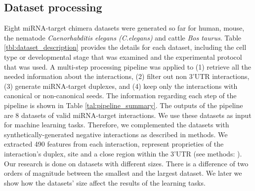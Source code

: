 \documentclass{bmcart}
\begin{document}
\subsection*{Dataset processing}
Eight miRNA-target chimera datasets were generated so far for human, mouse, the nematode \textit{Caenorhabditis elegans (C.elegans)} and cattle \textit{Bos taurus}. Table \ref{tbl:dataset_description} provides the details for each dataset, including the cell type or developmental stage that was examined and the experimental protocol that was used. A multi-step processing pipeline was applied to (1) retrieve all the needed information about the interactions, (2) filter out non 3'UTR interactions, (3) generate miRNA-target duplexes, and (4) keep only the interactions with canonical or non-canonical seeds. The information regarding each step of the pipeline is shown in Table \ref{tal:pipeline_summary}. The outputs of the pipeline are 8 datasets of valid miRNA-target interactions. We use these datasets as input for machine learning tasks. Therefore, we complemented the datasets with synthetically-generated negative interactions as described in methods. We extracted 490 features from each interaction, represent proprieties of the interaction's duplex, site and a close region within the 3'UTR (see methods: ).
Our research is done on datasets with different sizes. There is a difference of two orders of magnitude between the smallest and the largest dataset. We later we show how the datasets' size affect the results of the learning tasks.\\
\end{document}
